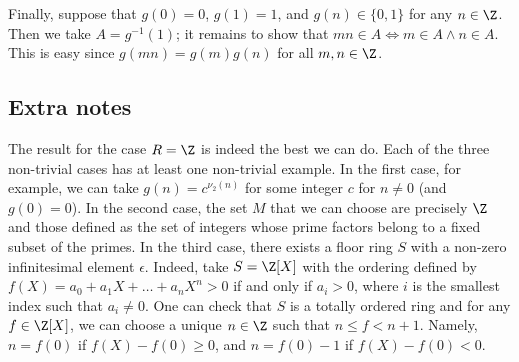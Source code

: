 Finally, suppose that $g(0) = 0$, $g(1) = 1$, and $g(n) \in \{0, 1\}$ for any $n \in \Z$.
Then we take $A = g^{-1}(1)$; it remains to show that $mn \in A \iff m \in A \wedge n \in A$.
This is easy since $g(mn) = g(m) g(n)$ for all $m, n \in \Z$.





\subsection*{Extra notes}

The result for the case $R = \Z$ is indeed the best we can do.
Each of the three non-trivial cases has at least one non-trivial example.
In the first case, for example, we can take $g(n) = c^{\nu_2(n)}$ for some integer $c$ for $n \neq 0$ (and $g(0) = 0$).
In the second case, the set $M$ that we can choose are precisely $\Z$ and those defined as the set of integers whose prime factors belong to a fixed subset of the primes.
In the third case, there exists a floor ring $S$ with a non-zero infinitesimal element $\epsilon$.
Indeed, take $S = \Z[X]$ with the ordering defined by $f(X) = a_0 + a_1 X + \ldots + a_n X^n > 0$ if and only if $a_i > 0$, where $i$ is the smallest index such that $a_i \neq 0$.
One can check that $S$ is a totally ordered ring and for any $f \in \Z[X]$, we can choose a unique $n \in \Z$ such that $n \leq f < n + 1$.
Namely, $n = f(0)$ if $f(X) - f(0) \geq 0$, and $n = f(0) - 1$ if $f(X) - f(0) < 0$.
